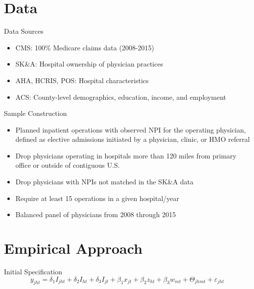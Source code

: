 \documentclass[t]{beamer}
\begin{document}
\section{Data}
\begin{frame}{Data Sources}
    \begin{itemize}
        \item<1-> CMS: 100\% Medicare claims data (2008-2015)
        \item<2-> SK\&A: Hospital ownership of physician practices
        \item<3-> AHA, HCRIS, POS: Hospital characteristics
        \item<4-> ACS: County-level demographics, education, income, and employment
    \end{itemize}
\end{frame}

\begin{frame}{Sample Construction}
    \begin{itemize}
        \item<1-> Planned inpatient operations with observed NPI for the operating physician, defined as elective admissions initiated by a physician, clinic, or HMO referral
        \item<2-> Drop physicians operating in hospitals more than 120 miles from primary office or outside of contiguous U.S.
        \item<3-> Drop physicians with NPIs not matched in the SK\&A data
        \item<4-> Require at least 15 operations in a given hospital/year
        \item<5-> Balanced panel of physicians from 2008 through 2015
    \end{itemize}
\end{frame}


\section{Empirical Approach}

\begin{frame}{Initial Specification}
    \begin{equation*}
        y_{jht} = \delta_{1} I_{jht} + \delta_{2} I_{ht} + \delta_{3} I_{jt} + \beta_{1} x_{jt} + \beta_{2} z_{ht} + \beta_{3} w_{mt} + \Theta_{jhmt} + \varepsilon_{jht}
    \end{equation*}
\end{frame}
\end{document}
